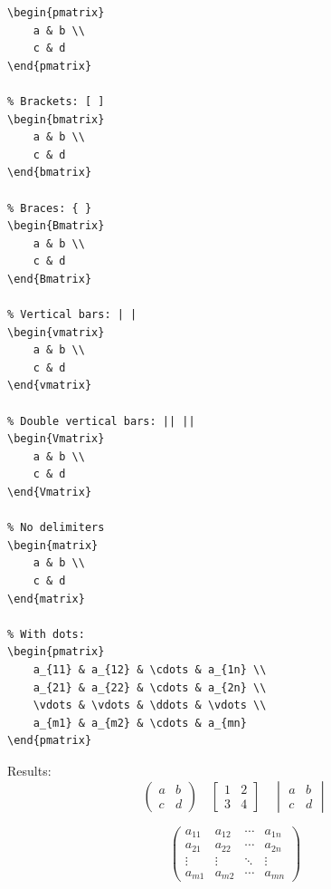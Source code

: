 \begin{lstlisting}[language={[LaTeX]TeX}, caption=Matrices]
% Parentheses: ( )
\begin{pmatrix}
    a & b \\
    c & d
\end{pmatrix}

% Brackets: [ ]
\begin{bmatrix}
    a & b \\
    c & d
\end{bmatrix}

% Braces: { }
\begin{Bmatrix}
    a & b \\
    c & d
\end{Bmatrix}

% Vertical bars: | |
\begin{vmatrix}
    a & b \\
    c & d
\end{vmatrix}

% Double vertical bars: || ||
\begin{Vmatrix}
    a & b \\
    c & d
\end{Vmatrix}

% No delimiters
\begin{matrix}
    a & b \\
    c & d
\end{matrix}

% With dots:
\begin{pmatrix}
    a_{11} & a_{12} & \cdots & a_{1n} \\
    a_{21} & a_{22} & \cdots & a_{2n} \\
    \vdots & \vdots & \ddots & \vdots \\
    a_{m1} & a_{m2} & \cdots & a_{mn}
\end{pmatrix}
\end{lstlisting}

Results:
\[
\begin{pmatrix} a & b \\ c & d \end{pmatrix}
\quad
\begin{bmatrix} 1 & 2 \\ 3 & 4 \end{bmatrix}
\quad
\begin{vmatrix} a & b \\ c & d \end{vmatrix}
\]

\[
\begin{pmatrix}
a_{11} & a_{12} & \cdots & a_{1n} \\
a_{21} & a_{22} & \cdots & a_{2n} \\
\vdots & \vdots & \ddots & \vdots \\
a_{m1} & a_{m2} & \cdots & a_{mn}
\end{pmatrix}
\]

